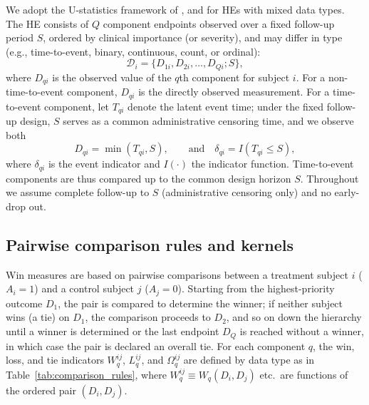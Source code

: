 \documentclass[11pt,a4paper]{article}
\begin{document}
We adopt the U-statistics framework of \cite{bebu_large_2016}, \cite{dong_win_2023} and \cite{zhang2026forss} for HEs with mixed data types. The HE consists of $Q$ component endpoints observed over a fixed follow-up period $S$,
ordered by clinical importance (or severity), and may differ in type (e.g., time-to-event,
binary, continuous, count, or ordinal):
\[
\mathcal{D}_i = \{ D_{1i}, D_{2i}, \ldots, D_{Qi}; S \},
\]
where $D_{qi}$ is the observed value of the $q$th component for subject $i$.
For a non-time-to-event component, $D_{qi}$ is the directly observed measurement.
For a time-to-event component, let $T_{qi}$ denote the latent event time; under the fixed
follow-up design, $S$ serves as a common administrative censoring time, and we observe both
\[
D_{qi} = \min(T_{qi}, S), \qquad \text{and} \quad \delta_{qi} = I(T_{qi} \le S),
\]
where $\delta_{qi}$ is the event indicator and $I(\cdot)$ the indicator function.
Time-to-event components are thus compared up to the common design horizon $S$.
Throughout we assume complete follow-up to $S$ (administrative censoring only) and no early-drop out. 

\subsection{Pairwise comparison rules and kernels}
\label{subsec:kernels}
Win measures are based on pairwise comparisons between a treatment subject $i$ ($A_i = 1$)
and a control subject $j$ ($A_j = 0$). Starting from the highest-priority outcome $D_1$,
the pair is compared to determine the winner; if neither subject wins (a tie) on $D_1$,
the comparison proceeds to $D_2$, and so on down the hierarchy until a winner is determined
or the last endpoint $D_Q$ is reached without a winner, in which case the pair is declared
an overall tie. For each component $q$, the win, loss, and tie indicators
$W_q^{ij}$, $L_q^{ij}$, and $\Omega_q^{ij}$ are defined by data type as in
Table~\ref{tab:comparison_rules}, where $W_q^{ij} \equiv W_q(D_i, D_j)$ etc.\ are
functions of the ordered pair $(D_i, D_j)$.
\end{document}
